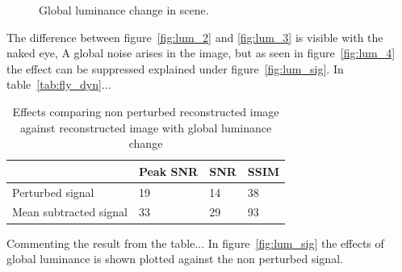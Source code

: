 \begin{figure}[H]
\begin{minipage}[t]{0.245\textwidth}
    \label{fig:lum_4}
\end{minipage}
    \caption{Global luminance change in scene.}
    \label{fig:lum_dyn}
\end{figure}


The difference between figure~\ref{fig:lum_2} and \ref{fig:lum_3} is visible with the naked eye, A global noise arises in the image, but as seen in figure~\ref{fig:lum_4} the effect can be suppressed explained under figure~\ref{fig:lum_sig}. In table~\ref{tab:fly_dyn}...


\begin{table}[H]
    \centering
  \begin{tabular}{ | l | l | l | l |}
    \hline
     & Peak SNR & SNR & SSIM \\ \hline
    Perturbed signal & 19 & 14 & 38 \\ \hline
    Mean subtracted signal & 33 & 29 & 93 \\
    \hline
  \end{tabular}
      \caption{Effects comparing non perturbed reconstructed image against reconstructed image with global luminance change}
    \label{tab:lum_dyn}
\end{table}


Commenting the result from the table... In figure~\ref{fig:lum_sig} the effects of global luminance is shown plotted against the non perturbed signal.\\[0.1in]


